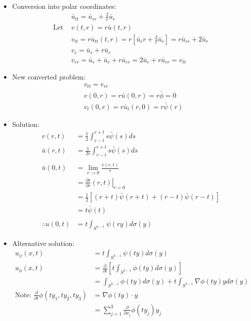 \documentclass[12pt, a4paper]{article}
\begin{document}
\begin{itemize}
    \item Conversion into polar coordinates:
    \begin{align*}
        &\bar{u}_{tt} = \bar{u}_{rr} + \frac{2}{r}\bar{u}_r\\
        \text{Let }&v(t, r) = r\bar{u}(t, r)\\
        &v_{tt} = r\bar{u}_{tt}(t, r) = r[\bar{u}_rr+\frac{2}{r}\bar{u}_r]=r\bar{u}_{rr}+2\bar{u}_r\\
        &v_r = \bar{u}_r + r\bar{u}_r\\
        &v_{rr} = \bar{u}_r + \bar{u}_r + r\bar{u}_{rr} = 2\bar{u}_r + r\bar{u}_{rr} = v_{tt}
    \end{align*}
    \item New converted problem:
    \begin{align*}
        &v_{tt}=v_{rr}\\
        &v(0, r) = r\bar{u}(0, r) = r\bar{\phi} = 0\\
        &v_t(0, r) = r\bar{u}_t(r, 0) = r\bar{\psi}(r)
    \end{align*}
    \item Solution:
    \begin{align*}
        v(r, t) &= \frac{1}{2}\int_{r-t}^{r+t}s\bar{\psi}(s)ds\\
        \bar{u}(r, t) &= \frac{1}{2r}\int_{r-t}^{r+t}s\bar{\psi}(s)ds\\\\
        \bar{u}(0, t) &= \lim_{r\to 0}\frac{v(r, t)}{r}\\
        &=\left.\frac{\partial v}{\partial r}(r, t)\right\rvert_{r=0}\\
        &=\frac{1}{2}[(r+t)\bar{\psi}(r+t)+(r-t)\bar{\psi}(r-t)]\\
        &=t\bar{\psi}(t)\\\\
        \therefore u(0, t) &= t\int_{S^{n-1}}\psi(ry)d\sigma(y)
    \end{align*}
    \item Alternative solution:
    \begin{align*}
        u_\psi(x, t) &= t \int_{S^{3-1}} \psi(ty)d\sigma(y)\\
        u_\phi(x, t) &= \frac{\partial}{\partial t}\left[t \int_{S^{3-1}} \phi(ty)d\sigma(y)\right]\\
        &=\int_{S^{3-1}} \phi(ty)d\sigma(y)+t\int_{S^{3-1}} \nabla \phi(ty)yd\sigma(y)\\
        \text{Note: } \frac{\partial}{\partial t}\phi(ty_1, ty_2, ty_3) &= \nabla \phi(ty)\cdot y\\
        &=\sum_{j=1}^3 \frac{\partial}{\partial x_j}\phi(ty_j)y_j
    \end{align*}
\end{itemize}
\end{document}
